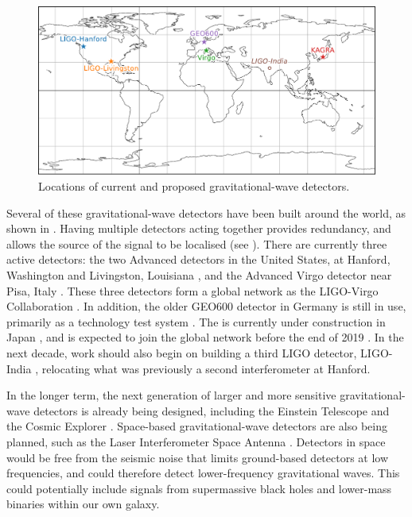 \begin{colsection}
\begin{figure}[t]
    \begin{center}
        \includegraphics[width=0.95\linewidth]{images/global.pdf}
    \end{center}
    \caption[Locations of gravitational-wave detectors]{
        Locations of current and proposed gravitational-wave detectors.
        }\label{fig:global}
\end{figure}

Several of these gravitational-wave detectors have been built around the world, as shown in . Having multiple detectors acting together provides redundancy, and allows the source of the signal to be localised (see ). There are currently three active detectors: the two Advanced  detectors in the United States, at Hanford, Washington and Livingston, Louisiana \citep{LIGO}, and the  Advanced Virgo detector near Pisa, Italy \citep{Virgo}. These three detectors form a global network as the LIGO-Virgo Collaboration  \citep[LVC,][]{LIGO-Virgo}. In addition, the older GEO600 detector in Germany is still in use, primarily as a technology test system \citep{GEO600}. The  is currently under construction in Japan \citep{KAGRA}, and is expected to join the global network before the end of 2019 \citep{LIGO-Virgo-KAGRA}. In the next decade, work should also begin on building a third LIGO detector, LIGO-India \citep{LIGO_India}, relocating what was previously a second interferometer at Hanford.

In the longer term, the next generation of larger and more sensitive gravitational-wave detectors is already being designed, including the Einstein Telescope \citep{EinsteinTelescope} and the Cosmic Explorer \citep{CosmicExplorer}. Space-based gravitational-wave detectors are also being planned, such as the Laser Interferometer Space Antenna  \citep[LISA,][]{LISA}. Detectors in space would be free from the seismic noise that limits ground-based detectors at low frequencies, and could therefore detect lower-frequency gravitational waves. This could potentially include signals from supermassive black holes and lower-mass binaries within our own galaxy.

\newpage

\end{colsection}

